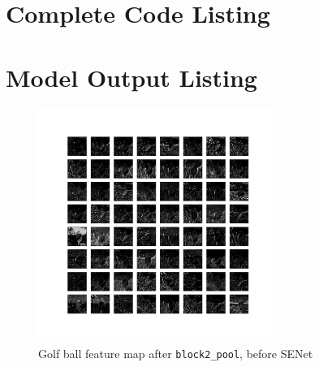 \documentclass{article}
\begin{document}
\begin{appendices}
\newpage
\section{Complete Code Listing} \label{codelist}



\newpage
\section{Model Output Listing} \label{modelouts}
\begin{figure}[H]
    \centering
    \includegraphics[width=3in]{csci-8110/hw-3/images/golf-pre-SENet-block2_pool-2020-11-05 18_25_06.663590_output.png}
    \caption{Golf ball feature map after \lstinline{block2_pool}, before SENet}
    \label{fig:golf_2_pre}
\end{figure}


\end{appendices}
\end{document}
